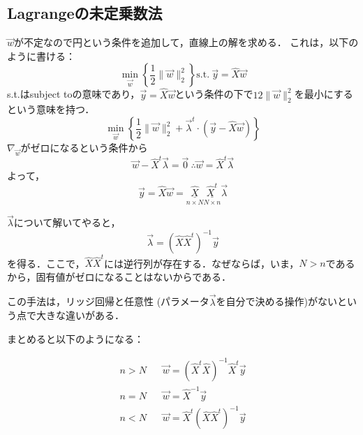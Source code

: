\subsection{Lagrangeの未定乗数法}
$\vec{w}$が不定なので円という条件を追加して，直線上の解を求める．
これは，以下のように書ける：
\begin{equation}
    \min_{\vec{w}}\left\{
        \frac{1}{2}\|\vec{w}\|^2_2
        \right\}
        \text{s.t.}\ 
        \vec{y}=\hat{X}\vec{w}
\end{equation}
s.t.はsubject toの意味であり，$\vec{y}=\hat{X}\vec{w}$という条件の下で${1}{2}\|\vec{w}\|^2_2$を最小にするという意味を持つ．
\begin{equation}
    \min_{\vec{w}}\left\{
        \frac{1}{2}\|\vec{w}\|^2_2
        +\vec{\lambda}^t \cdot (\vec{y}-\hat{X}\vec{w})
        \right\}
\end{equation}
$\nabla_{\vec{w}}$がゼロになるという条件から
\begin{equation}
     \vec{w} - \hat{X}^t\vec{\lambda} = \vec{0}\ 
     \therefore \vec{w} = \hat{X}^t\vec{\lambda}
\end{equation}
よって，
\begin{equation}
    \vec{y} = \hat{X}\vec{w} = {\underset{n\times N}{\underline{\hat{X}}}}
    {\underset{N\times n}{\underline{\hat{X}^t}}}\vec{\lambda}
\end{equation}

$\vec{\lambda}$について解いてやると，
\begin{equation}
    \vec{\lambda} = (\hat{X}\hat{X}^t)^{-1}\vec{y}
\end{equation}
を得る．ここで，$\hat{X}\hat{X}^t$には逆行列が存在する．なぜならば，いま，$N>n$であるから，固有値がゼロになることはないからである．

この手法は，リッジ回帰と任意性 (パラメータ$\vec{\lambda}$を自分で決める操作)がないという点で大きな違いがある．

まとめると以下のようになる：

\begin{align}
    n > N&\hspace{10pt} \vec{w} = (\hat{X}^t\hat{X})^{-1} \hat{X}^t \vec{y}\\[10pt]
    n = N&\hspace{10pt} \vec{w} = \hat{X}^{-1} \vec{y}\\[10pt]
    n < N&\hspace{10pt} \vec{w} = \hat{X}^t (\hat{X}\hat{X}^t)^{-1} \vec{y}
\end{align}



